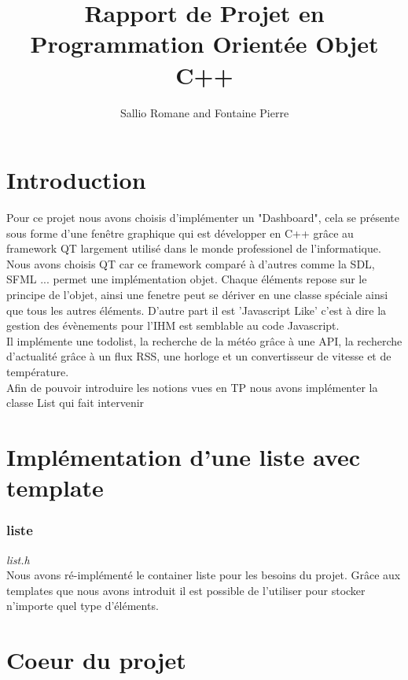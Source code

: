 \documentclass[12pt]{report}
\title{Rapport de Projet en Programmation Orientée Objet C++}
\author{Sallio Romane and Fontaine Pierre}
\begin{document}
  \maketitle
  \newpage
  \tableofcontents
  \part{Introduction}
    Pour ce projet nous avons choisis d'implémenter un "Dashboard", cela se présente sous forme d'une fenêtre graphique qui est développer en C++ grâce au framework QT largement utilisé dans le monde professionel de l'informatique.\\

    Nous avons choisis QT car ce framework comparé à d'autres comme la SDL, SFML ... permet une implémentation objet. Chaque éléments repose sur le principe de l'objet, ainsi une fenetre peut se dériver en une classe spéciale ainsi que tous les autres éléments. D'autre part il est 'Javascript Like' c'est à dire la gestion des évènements pour l'IHM est semblable au code Javascript.\\

    Il implémente une todolist, la recherche de la météo grâce à une API, la recherche d'actualité grâce à un flux RSS, une horloge et un convertisseur de vitesse et de température. \\

    Afin de pouvoir introduire les notions vues en TP nous avons implémenter la classe List qui fait intervenir

  \part{Implémentation d'une liste avec template}
    \section{liste}
      \emph{list.h}\\

      Nous avons ré-implémenté le container liste pour les besoins du projet. Grâce aux templates que nous avons introduit il est possible de l'utiliser pour stocker n'importe quel type d'éléments.
  \part{Coeur du projet}
\end{document}
